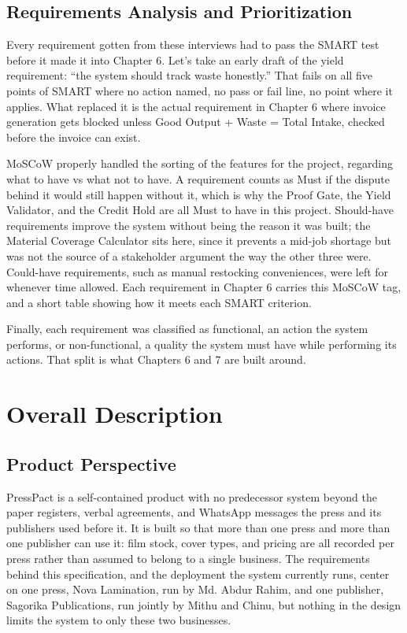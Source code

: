\documentclass{scrreprt}
\begin{document}
\section{Requirements Analysis and Prioritization}
Every requirement gotten from these interviews had to pass the SMART test before it made it into Chapter 6. Let's take an early draft of the yield requirement: ``the system should track waste honestly.'' That fails on all five points of SMART where no action named, no pass or fail line, no point where it applies. What replaced it is the actual requirement in Chapter 6 where invoice generation gets blocked unless Good Output + Waste = Total Intake, checked before the invoice can exist.

MoSCoW properly handled the sorting of the features for the project, regarding what to have vs what not to have. A requirement counts as Must if the dispute behind it would still happen without it, which is why the Proof Gate, the Yield Validator, and the Credit Hold are all Must to have in this project. Should-have requirements improve the system without being the reason it was built; the Material Coverage Calculator sits here, since it prevents a mid-job shortage but was not the source of a stakeholder argument the way the other three were. Could-have requirements, such as manual restocking conveniences, were left for whenever time allowed. Each requirement in Chapter 6 carries this MoSCoW tag, and a short table showing how it meets each SMART criterion.

Finally, each requirement was classified as functional, an action the system performs, or non-functional, a quality the system must have while performing its actions. That split is what Chapters 6 and 7 are built around.

\chapter{Overall Description}

\section{Product Perspective}
PressPact is a self-contained product with no predecessor system beyond the paper registers, verbal agreements, and WhatsApp messages the press and its publishers used before it. It is built so that more than one press and more than one publisher can use it: film stock, cover types, and pricing are all recorded per press rather than assumed to belong to a single business. The requirements behind this specification, and the deployment the system currently runs, center on one press, Nova Lamination, run by Md. Abdur Rahim, and one publisher, Sagorika Publications, run jointly by Mithu and Chinu, but nothing in the design limits the system to only these two businesses.
\end{document}
